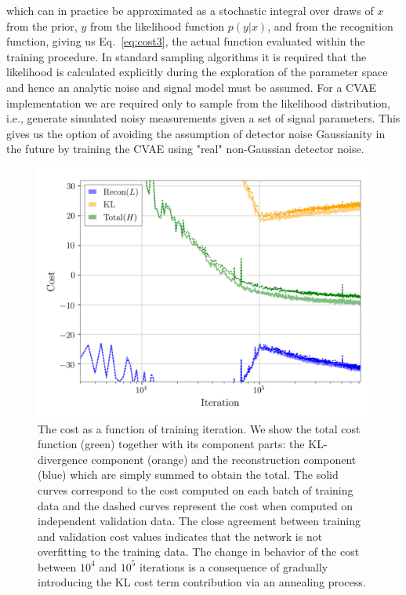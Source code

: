 \documentclass[%
showpacs,
nofootinbib,
 amsmath,amssymb,
 aps,
 twocolumn,
 prl,
 reprint,
floatfix,
]{revtex4-1}
\begin{document}
%
which can in practice be approximated as a stochastic integral over draws of
$x$ from the prior, $y$ from the likelihood function $p(y|x)$, and from the
recognition function, giving us Eq.~\ref{eq:cost3}, the actual function
evaluated within the training procedure. In standard sampling algorithms it is
required that the likelihood is calculated explicitly during the exploration of
the parameter space and hence an analytic noise and signal model must be
assumed. For a \ac{CVAE} implementation we are required only to sample from
the likelihood distribution, i.e., generate simulated noisy measurements given a
set of signal parameters. This gives us the option of avoiding the assumption
of detector noise Gaussianity in the future by training the \ac{CVAE} using "real"
non-Gaussian detector noise.

%
%
\begin{figure}
    \includegraphics[width=\columnwidth]{inv_losses_log.png}
\caption{\label{fig:loss_log} The cost as a function of training iteration.
We show the total cost function (green) together with its component parts:
the \ac{KL}-divergence component (orange) and the reconstruction component
(blue) which are simply summed to obtain the total. The solid curves correspond
to the cost computed on each batch of training data and the dashed curves
represent the cost when computed on independent validation data. The close
agreement between training and validation cost values indicates that the
network is not overfitting to the training data. The change in behavior of the
cost between $10^4$ and $10^5$ iterations is a consequence of gradually
introducing the \ac{KL} cost term contribution via an annealing process.} 
\end{figure}
\end{document}
